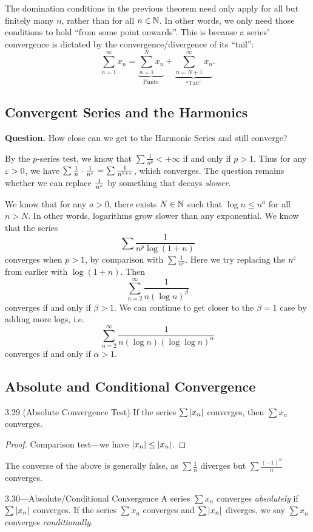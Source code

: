\documentclass[class=article, crop=false]{standalone}
\begin{document}
  \begin{note}{}
    The domination conditions in the previous theorem need only apply for all but finitely many $n$, rather than for all $n\in\mathbb{N}$. In other words, we only need those conditions to hold ``from some point onwards''. This is because a series' convergence is dictated by the convergence/divergence of its ``tail'':
    \[
      \sum_{n=1}^{\infty} x_n = \underbrace{\sum_{n=1}^{N}x_n}_{\text{Finite}} + \underbrace{\sum_{n=N+1}^{\infty}x_n}_{\text{``Tail''}}.
    \]
  \end{note}
  \subsection{Convergent Series and the Harmonics}
  \textbf{Question.} How close can we get to the Harmonic Series and still converge? \par
  By the $p$-series test, we know that $\sum \frac{1}{n^p} < +\infty$ if and only if $p > 1$. Thus for any $\varepsilon > 0$, we have $\sum \frac{1}{n}\cdot \frac{1}{n^{\varepsilon}} = \sum \frac{1}{n^{1 + \varepsilon}}$, which converges. The question remains whether we can replace $\frac{1}{n^{\varepsilon}}$ by something that decays \emph{slower}. \par
  We know that for any $a > 0$, there exists $N\in\mathbb{N}$ such that $\log n\leq n^a$ for all $n > N$. In other words, logarithms grow slower than any exponential. We know that the series
  \[
    \sum \frac{1}{n^p\log (1 + n)}
  \]
  converges when $p > 1$, by comparison with $\sum \frac{1}{n^p}$. Here we try replacing the $n^{\varepsilon}$ from earlier with $\log (1 + n)$. Then
  \[
    \sum_{n=2}^{\infty} \frac{1}{n (\log n)^\beta}
  \]
  converges if and only if $\beta > 1$. We can continue to get closer to the $\beta = 1$ case by adding more logs, i.e.
  \[
    \sum_{n=2}^{\infty} \frac{1}{n (\log n)(\log\log n)^\alpha}
  \]
  converges if and only if $\alpha > 1$.
  \subsection{Absolute and Conditional Convergence}
  \begin{theorem}{3.29 (Absolute Convergence Test)}
    If the series $\sum \left\lvert x_n \right\rvert$ converges, then $\sum x_n$ converges.
    \begin{proof}
      Comparison test---we have $\left\lvert x_n \right\rvert\leq \left\lvert x_n \right\rvert$.
    \end{proof}
  \end{theorem}
  \begin{note}{}
    The converse of the above is generally false, as $\sum\frac{1}{n}$ diverges but $\sum \frac{(-1)^n}{n}$ converges.
  \end{note}
  \begin{definition}{3.30---Absolute/Conditional Convergence}
    A series $\sum x_n$ converges \emph{absolutely} if $\sum \left\lvert x_n \right\rvert$ converges. If the series $\sum x_n$ converges and $\sum \left\lvert x_n \right\rvert$ diverges, we say $\sum x_n$ converges \emph{conditionally}.
  \end{definition}
\end{document}
